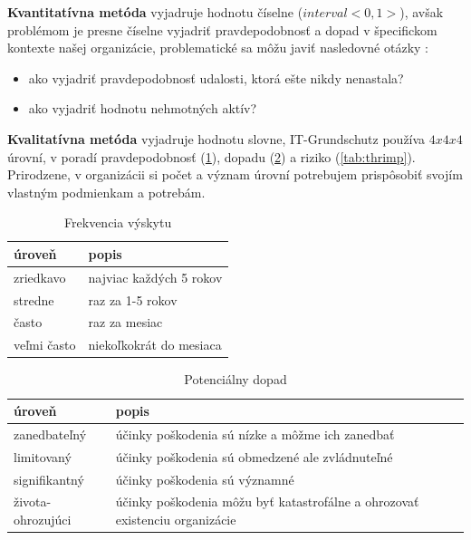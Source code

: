 \textbf{Kvantitatívna metóda} vyjadruje hodnotu číselne ($interval <0,1>$), avšak problémom je presne číselne vyjadriť pravdepodobnosť a dopad
v špecifickom kontexte našej organizácie, problematické sa môžu javiť nasledovné otázky \cite{MFSRIB}:
\begin{itemize}[nosep]
    \item ako vyjadriť pravdepodobnosť udalosti, ktorá ešte nikdy nenastala?
    \item ako vyjadriť hodnotu nehmotných aktív?
\end{itemize}

\textbf{Kvalitatívna metóda} vyjadruje hodnotu slovne, IT-Grundschutz používa $4x4x4$ úrovní, v poradí pravdepodobnosť (\ref{tab:thrfreq}),
dopadu (\ref{tab:thrdmg}) a riziko (\ref{tab:thrimp}). Prirodzene, v organizácii si počet a význam úrovní potrebujem prispôsobiť svojím vlastným
podmienkam a potrebám. 
\begin{table}[!h]
    \caption{Frekvencia výskytu}
    \label{tab:thrfreq}
    \begin{center}
        \footnotesize
        \begin{tabularx}{\textwidth}{|X|X|}
        \hline
        úroveň & popis \\
        \hline
        \hline
        zriedkavo & najviac každých 5 rokov \\
        \hline
        stredne & raz za 1-5 rokov \\
        \hline
        často & raz za mesiac \\
        \hline
        veľmi často & niekoľkokrát do mesiaca  \\
        \hline
        \end{tabularx}
    \end{center}
\end{table}

\begin{table}[!h]
    \caption{Potenciálny dopad}
    \label{tab:thrdmg}
    \begin{center}
        \footnotesize
        \begin{tabularx}{\textwidth}{|X|X|}
        \hline
        úroveň & popis \\
        \hline
        \hline
        zanedbateľný & účinky poškodenia sú nízke a môžme ich zanedbať  \\
        \hline
        limitovaný & účinky poškodenia sú obmedzené ale zvládnuteľné \\
        \hline
        signifikantný & účinky poškodenia sú významné  \\
        \hline
        života-ohrozujúci & účinky poškodenia môžu byť katastrofálne a ohrozovať existenciu organizácie \\
        \hline
        \end{tabularx}
    \end{center}
\end{table}

